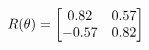 \documentclass[preview]{standalone}
\begin{document}
\begin{align*}
\special{dvisvgm:raw <g id='unique000'>}R(\theta) = \begin{bmatrix}0.82 & 0.57\\-0.57 & 0.82\end{bmatrix}\special{dvisvgm:raw </g>}
\end{align*}
\end{document}
